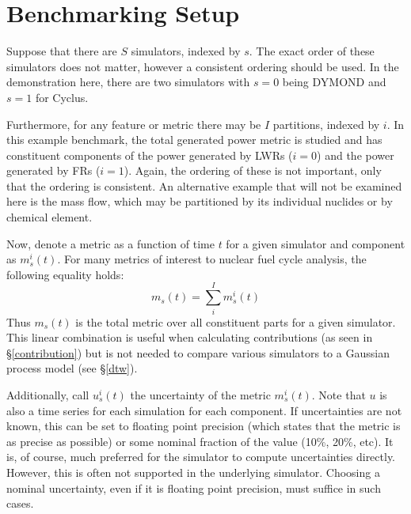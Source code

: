 \section{Benchmarking Setup}
\label{setup}

Suppose that there are $S$ simulators, indexed by $s$. The exact order 
of these simulators does not matter, however a consistent ordering should
be used. In the demonstration here, there are two simulators with $s=0$
being DYMOND and $s=1$ for Cyclus.

Furthermore, for any feature or metric there may be $I$ partitions, 
indexed by $i$. In this example benchmark, the total generated power metric
is studied and has constituent components of the power generated by LWRs 
($i=0$) and
the power generated by FRs ($i=1$).  Again, the ordering of these is not 
important, only that the ordering is consistent. An alternative example
that will not be examined here is the mass flow, which may be partitioned 
by its individual nuclides or by chemical element.

Now, denote a metric as a function of time $t$ for a given simulator and 
component as $m_s^i(t)$. For many metrics of interest 
to nuclear fuel cycle analysis, the following equality holds:
\begin{equation}
m_s(t) = \sum_i^I m_s^i(t)
\end{equation}
Thus $m_s(t)$ is the total metric over all constituent parts for a given 
simulator. This linear combination is useful when calculating contributions
(as seen in \S\ref{contribution}) but is not needed to compare various 
simulators to a Gaussian process model (see \S\ref{dtw}).

Additionally, call $u_s^i(t)$ the uncertainty of the metric 
$m_s^i(t)$. Note that $u$ is also a time series for each simulation for 
each component. If uncertainties are not known, this can be set to floating
point precision (which states that the metric is as precise as possible) or
some nominal fraction of the value (10\%, 20\%, etc). It is, of course, 
much preferred for the simulator to compute 
uncertainties directly. However, this is often not supported in the underlying
simulator. Choosing a nominal uncertainty, even if it is floating point 
precision, must suffice in such cases.

